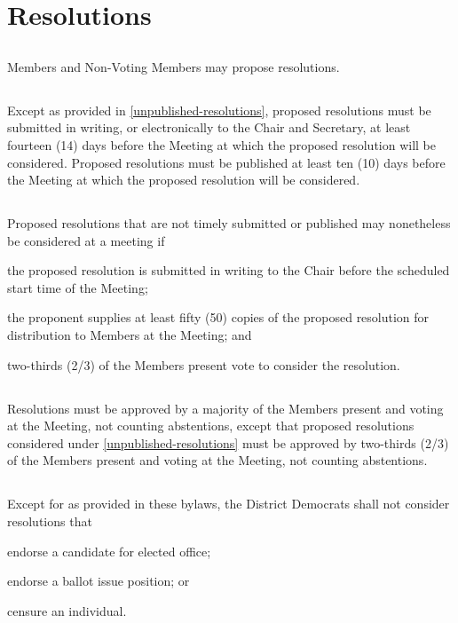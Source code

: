 \section{Resolutions}
\subsection{}
Members and Non-Voting Members may propose resolutions.

\subsection{}
Except as provided in \autoref{unpublished-resolutions}, proposed resolutions must be submitted in writing, or electronically to the Chair and Secretary, at least fourteen (14) days before the Meeting at which the proposed resolution will be considered. Proposed resolutions must be published at least ten (10) days before the Meeting at which the proposed resolution will be considered.

\subsection{} \label{unpublished-resolutions}
Proposed resolutions that are not timely submitted or published may nonetheless be considered at a meeting if
\begin{inlinealphalist}
    \item the proposed resolution is submitted in writing to the Chair before the scheduled start time of the Meeting;
    \item the proponent supplies at least fifty (50) copies of the proposed resolution for distribution to Members at the Meeting; and
    \item two-thirds (2/3) of the Members present vote to consider the resolution.
\end{inlinealphalist}

\subsection{}
Resolutions must be approved by a majority of the Members present and voting at the Meeting, not counting abstentions, except that proposed resolutions considered under \autoref{unpublished-resolutions} must be approved by two-thirds (2/3) of the Members present and voting at the Meeting, not counting abstentions.

\subsection{}
Except for as provided in these bylaws, the \fortythird{} District Democrats shall not consider resolutions that
\begin{inlinealphalist}
    \item endorse a candidate for elected office;
    \item endorse a ballot issue position; or
    \item censure an individual.
\end{inlinealphalist}

